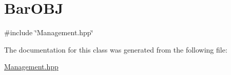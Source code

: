 \hypertarget{classBarOBJ}{}\section{Bar\+O\+BJ}
\label{classBarOBJ}


{\ttfamily \#include \char`\"{}Management.\+hpp\char`\"{}}



The documentation for this class was generated from the following file\+:\begin{DoxyCompactItemize}
\item 
\hyperlink{Management_8hpp}{Management.\+hpp}\end{DoxyCompactItemize}

